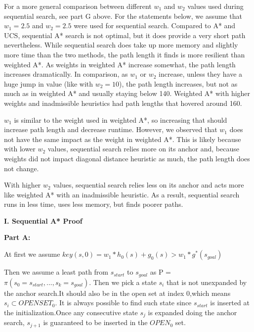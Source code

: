 \documentclass[12pt, letterpaper]{article}
\begin{document}
For a more general comparison between different $w_1$ and $w_2$ values used during sequential search, see part G above. For the statements below, we assume that $w_1 = 2.5$ and $w_2 = 2.5$ were used for sequential search. Compared to A* and UCS, sequential A* search is not optimal, but it does provide a very short path nevertheless. While sequential search does take up more memory and slightly more time than the two methods, the path length it finds is more resilient than weighted A*. As weights in weighted A* increase somewhat, the path length increases dramatically. In comparison, as $w_1$ or $w_2$ increase, unless they have a huge jump in value (like with $w_2 = 10$), the path length increases, but not as much as in weighted A* and usually staying below 140. Weighted A* with higher weights and inadmissible heuristics had path lengths that hovered around 160.

$w_1$ is similar to the weight used in weighted A*, so increasing that should increase path length and decrease runtime. However, we observed that $w_1$ does not have the same impact as the weight in weighted A*. This is likely because with lower $w_2$ values, sequential search relies more on its anchor and, because weights did not impact diagonal distance heuristic as much, the path length does not change.

With higher $w_2$ values, sequential search relies less on its anchor and acts more like weighted A* with an inadmissible heuristic. As a result, sequential search runs in less time, uses less memory, but finds poorer paths.




\pagebreak %

\noindent \textbf{I. Sequential A* Proof}

\noindent \textbf{Part A:}

\noindent At first we assume $ key(s,0)= w_1*h_0(s)+g_0(s) > w_1 * g^*(s_{goal}) $

\medskip

Then we assume a least path from $s_{start} $ to $s_{goal} $ as P = $ \pi(s_0=s_{start},...,s_k=s_{goal}) $. Then we pick a state $ s_i $ that is not unexpanded by the anchor search.It should also be in the open set at index 0,which means $ s_i \subset OPENSET_0 $.
It is always possible to find such state since $ s_{start} $ is inserted at the initialization.Once any consecutive state $ s_j $ is expanded doing the anchor search, $ s_{j+1} $ is guaranteed to be inserted in the $ OPEN_0 $ set. 
\end{document}
